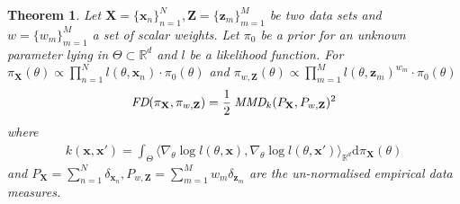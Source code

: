 \documentclass[hyperref]{article}
\theoremstyle{plain}
\newtheorem{theorem}{Theorem}[section]
\theoremstyle{remark}
\newcommand{\bx}{\mathbf{x}}
\newcommand{\bz}{\mathbf{z}}
\newcommand{\bX}{\mathbf{X}}
\newcommand{\bZ}{\mathbf{Z}}
\newcommand{\bbR}{\mathbb{R}}
\begin{document}
\begin{theorem}\label{thm:characterise}
	Let $\bX = \{\bx_{n}\}_{n=1}^{N}, \bZ = \{\bz_{m}\}_{m=1}^{M}$ be two data sets and $w = \{w_{m}\}_{m=1}^{M}$ a set of scalar weights. Let $\pi_{0}$ be a prior for an unknown parameter lying in $\Theta \subset \bbR^{d}$ and $l$ be a likelihood function. For  ${\pi_{\bX}(\theta)\propto\prod_{n=1}^{N}l(\theta,\bx_{n})\cdot\pi_{0}(\theta)}$ and ${\pi_{w,\bZ}(\theta)\propto\prod_{m=1}^{M}l(\theta,\bz_{m})^{w_{m}}\cdot\pi_{0}(\theta)}$  
	\begin{align*}
		\emph{FD}(\pi_{\bX},\pi_{w,\bZ}) = \frac{1}{2}\:\emph{MMD}_{k}(P_{\bX}, P_{w,\bZ})^{2} 
	\end{align*}
	where 
	\begin{align*}
		k(\bx,\bx') = \int_{\Theta}\langle\nabla_{\theta}\log l(\theta,\bx),\nabla_{\theta}\log l(\theta,\bx')\rangle_{\bbR^{d}} \mathrm{d}\pi_{\bX}(\theta)
	\end{align*}
	and $P_{\bX} = \sum_{n=1}^{N}\delta_{\bx_{n}}, P_{w,\bZ} = \sum_{m=1}^{M}w_{m}\delta_{\bz_{m}}$ are the un-normalised empirical data measures. 
\end{theorem}
\end{document}
